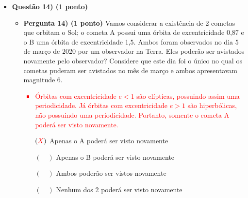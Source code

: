 \documentclass[a4paper, 12pt]{article}
\newcommand{\red}[1]{\textcolor{red}{#1}}
\begin{document}
\begin{flushleft}
\begin{itemize}
            \item \textbf{Questão 14) (1 ponto)}
                \begin{itemize}
                    \item \textbf{Pergunta 14) (1 ponto)} Vamos considerar a existência de 2 cometas que orbitam o Sol; o cometa A possui uma órbita de excentricidade 0,87 e o B uma órbita de excentricidade 1,5. Ambos foram observados no dia 5 de março de 2020 por um observador na Terra. Eles poderão ser avistados novamente pelo observador? Considere que este dia foi o único no qual os cometas puderam ser avistados no mês de março e ambos apresentavam magnitude 6.
                        \red{\begin{itemize}
                            \item Órbitas com excentricidade $e < 1$ são elípticas, possuindo assim uma periodicidade. Já órbitas com excentricidade $e > 1$ são hiperbólicas, não possuindo uma periodicidade. Portanto, somente o cometa A poderá ser visto novamente.
                        \end{itemize}}
                        \begin{itemize}
                            \item[$(\red{X})$] Apenas o A poderá ser visto novamente
                            \item[$(\quad)$] Apenas o B poderá ser visto novamente
                            \item[$(\quad)$] Ambos poderão ser vistos novamente
                            \item[$(\quad)$] Nenhum dos 2 poderá ser visto novamente
                        \end{itemize}
                \end{itemize}


\end{itemize}
\end{flushleft}
\end{document}
